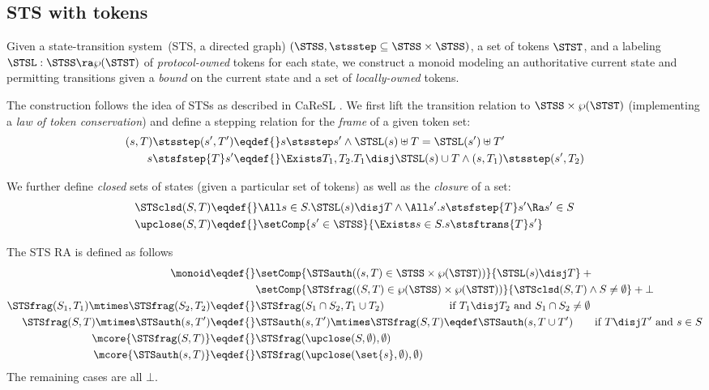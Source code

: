 \subsection{STS with tokens}
\label{sec:stsmon}

Given a state-transition system~(STS, \ie a directed graph) $(\STSS, {\stsstep} \subseteq \STSS \times \STSS)$, a set of tokens $\STST$, and a labeling $\STSL: \STSS \ra \wp(\STST)$ of \emph{protocol-owned} tokens for each state, we construct a monoid modeling an authoritative current state and permitting transitions given a \emph{bound} on the current state and a set of \emph{locally-owned} tokens.

The construction follows the idea of STSs as described in CaReSL \cite{caresl}.
We first lift the transition relation to $\STSS \times \wp(\STST)$ (implementing a \emph{law of token conservation}) and define a stepping relation for the \emph{frame} of a given token set:
\begin{align*}
 (s, T) \stsstep (s', T') \eqdef{}& s \stsstep s' \land \STSL(s) \uplus T = \STSL(s') \uplus T' \\
 s \stsfstep{T} s' \eqdef{}& \Exists T_1, T_2. T_1 \disj \STSL(s) \cup T \land (s, T_1) \stsstep (s', T_2)
\end{align*}

We further define \emph{closed} sets of states (given a particular set of tokens) as well as the \emph{closure} of a set:
\begin{align*}
\STSclsd(S, T) \eqdef{}& \All s \in S. \STSL(s) \disj T \land \All s'. s \stsfstep{T} s' \Ra s' \in S \\
\upclose(S, T) \eqdef{}& \setComp{ s' \in \STSS}{\Exists s \in S. s \stsftrans{T} s' }
\end{align*}

The STS RA is defined as follows
\begin{align*}
  \monoid \eqdef{}& \setComp{\STSauth((s, T) \in \STSS \times \wp(\STST))}{\STSL(s) \disj T} +{}\\& \setComp{\STSfrag((S, T) \in \wp(\STSS) \times \wp(\STST))}{\STSclsd(S, T) \land S \neq \emptyset} + \bot \\
  \STSfrag(S_1, T_1) \mtimes \STSfrag(S_2, T_2) \eqdef{}& \STSfrag(S_1 \cap S_2, T_1 \cup T_2) \qquad\qquad\qquad \text{if $T_1 \disj T_2$ and $S_1 \cap S_2 \neq \emptyset$} \\
  \STSfrag(S, T) \mtimes \STSauth(s, T') \eqdef{}& \STSauth(s, T') \mtimes \STSfrag(S, T) \eqdef \STSauth(s, T \cup T') \qquad \text{if $T \disj T'$ and $s \in S$} \\
  \mcore{\STSfrag(S, T)} \eqdef{}& \STSfrag(\upclose(S, \emptyset), \emptyset) \\
  \mcore{\STSauth(s, T)} \eqdef{}& \STSfrag(\upclose(\set{s}, \emptyset), \emptyset)
\end{align*}
The remaining cases are all $\bot$.

